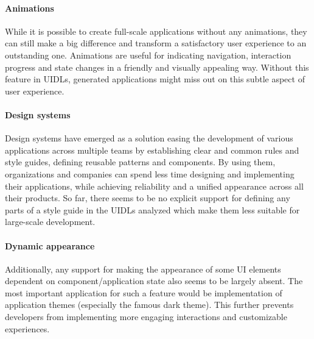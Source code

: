 \paragraph{Animations}
While it is possible to create full-scale applications without any animations, they can still make a big difference and transform a satisfactory user experience to an outstanding one.
Animations are useful for indicating navigation, interaction progress and state changes in a friendly and visually appealing way.
Without this feature in UIDLs, generated applications might miss out on this subtle aspect of user experience.

\paragraph{Design systems}
Design systems have emerged as a solution easing the development of various applications across multiple teams by establishing clear and common rules and style guides, defining reusable patterns and components.
By using them, organizations and companies can spend less time designing and implementing their applications, while achieving reliability and a unified appearance across all their products.
So far, there seems to be no explicit support for defining any parts of a style guide in the UIDLs analyzed which make them less suitable for large-scale development.

\paragraph{Dynamic appearance}
Additionally, any support for making the appearance of some UI elements dependent on component/application state also seems to be largely absent.
The most important application for such a feature would be implementation of application themes (especially the famous dark theme).
This further prevents developers from implementing more engaging interactions and customizable experiences.
